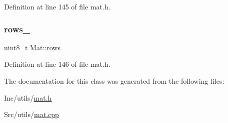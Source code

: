 Definition at line 145 of file mat.\+h.

\mbox{\label{class_mat_aad27e7e5a9e5672a3ae21493892fc67e}} 
\subsubsection{\texorpdfstring{rows\_}{rows\_}}
{\footnotesize\ttfamily uint8\+\_\+t Mat\+::rows\+\_\+\hspace{0.3cm}{\ttfamily [private]}}



Definition at line 146 of file mat.\+h.



The documentation for this class was generated from the following files\+:\begin{DoxyCompactItemize}
\item 
Inc/utils/\mbox{\hyperlink{mat_8h}{mat.\+h}}\item 
Src/utils/\mbox{\hyperlink{mat_8cpp}{mat.\+cpp}}\end{DoxyCompactItemize}
